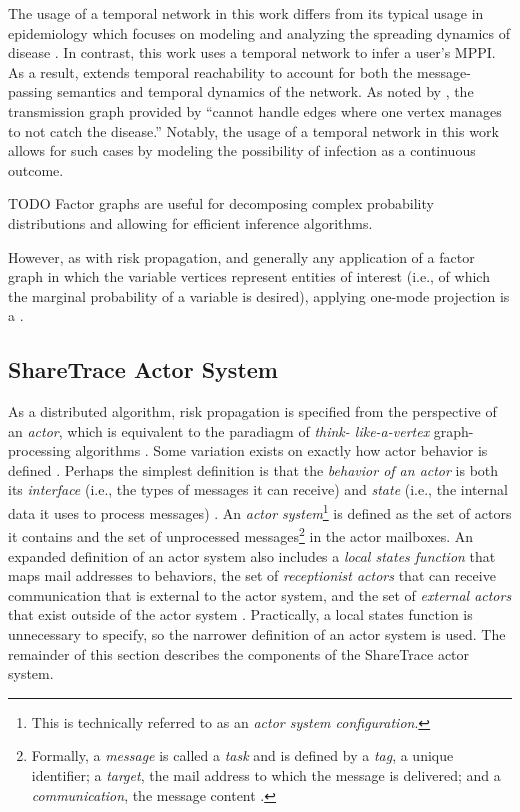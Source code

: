 The usage of a temporal network in this work differs from its typical usage in
epidemiology which focuses on modeling and analyzing the spreading dynamics of
disease \cite{Riolo2001, Danon2011, Lokhov2014, Craft2015, Pastor-Satorras2015,
Koher2019, Zino2021}. In contrast, this work uses a temporal network to infer a
user's MPPI. As a result,  extends temporal reachability
to account for both the message-passing semantics and temporal dynamics of
the network. As noted by \cite{Holme2012}, the transmission graph provided by
\cite{Riolo2001} ``cannot handle edges where one vertex manages to not catch
the disease.'' Notably, the usage of a temporal network in this work allows for
such cases by modeling the possibility of infection as a continuous outcome.

%
TODO
Factor graphs are useful for decomposing complex probability distributions and
allowing for efficient inference algorithms.

However, as with risk propagation, and generally any application of a factor
graph in which the variable vertices represent entities of interest (i.e., of
which the marginal probability of a variable is desired), applying one-mode
projection is a .

\subsection{ShareTrace Actor System}

As a distributed algorithm, risk propagation is specified from the perspective
of an \emph{actor}, which is equivalent to the paradiagm of \emph{think-
like-a-vertex} graph-processing algorithms \cite{McCune2015}. Some
variation exists on exactly how actor behavior is defined \cite{AghaThesis1985,
Agha1985, Koster2016}. Perhaps the simplest definition is that the
\emph{behavior of an actor} is both its \emph{interface} (i.e., the types of
messages it can receive) and \emph{state} (i.e., the internal data it uses to
process messages) \cite{Koster2016}. An \emph{actor system}\footnote{This is
technically referred to as an \emph{actor system configuration}.} is defined as
the set of actors it contains and the set of unprocessed
messages\footnote{Formally, a \emph{message} is called a \emph{task} and is
defined by a \emph{tag}, a unique identifier; a \emph{target}, the mail address
to which the message is delivered; and a \emph{communication}, the message
content \cite{AghaThesis1985}.} in the actor mailboxes. An expanded definition
of an actor system also includes a \emph{local states function} that maps mail
addresses to behaviors, the set of \emph{receptionist actors} that can receive
communication that is external to the actor system, and the set of
\emph{external actors} that exist outside of the actor system
\cite{AghaThesis1985, Agha1985}. Practically, a local states function is
unnecessary to specify, so the narrower definition of an actor system is used.
The remainder of this section describes the components of the ShareTrace actor
system.

